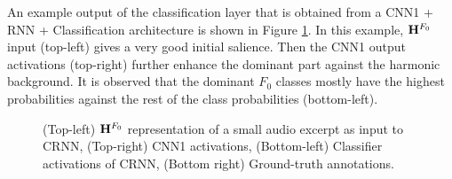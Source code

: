 \documentclass{article}
\begin{document}
An example output of the classification layer that is obtained from a CNN1 + RNN + Classification architecture is shown in Figure \ref{fig:Model-1-Example}.
In this example, $\mathbf{H}^{F_{0}}$ input (top-left) gives a very good initial salience. Then the CNN1 output activations (top-right) further enhance the dominant part against the harmonic background. It is observed that the dominant $F_0$ classes mostly have the highest probabilities against the rest of the class probabilities (bottom-left).
\begin{figure}
 \centerline{}
 \caption{(Top-left) $\mathbf{H}^{F_{0}}$ representation of a small audio excerpt as input to CRNN, (Top-right) CNN1 activations, (Bottom-left) Classifier activations of CRNN, (Bottom right) Ground-truth annotations.}
 \label{fig:Model-1-Example}
\end{figure}



\end{document}
